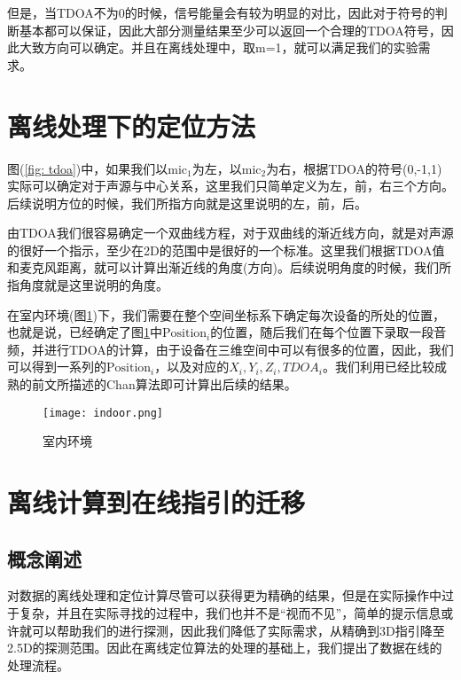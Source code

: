 \documentclass[winfonts]{njuthesis}
\begin{document}
		但是，当TDOA不为0的时候，信号能量会有较为明显的对比，因此对于符号的判断基本都可以保证，因此大部分测量结果至少可以返回一个合理的TDOA符号，因此大致方向可以确定。并且在离线处理中，取m=1，就可以满足我们的实验需求。
		
	\section{离线处理下的定位方法}
		
		图(\ref{fig: tdoa})中，如果我们以$\text{mic}_1$为左，以$\text{mic}_2$为右，根据TDOA的符号(0,-1,1)实际可以确定对于声源与中心关系，这里我们只简单定义为左，前，右三个方向。后续说明方位的时候，我们所指方向就是这里说明的左，前，后。
	
		由TDOA我们很容易确定一个双曲线方程，对于双曲线的渐近线方向，就是对声源的很好一个指示，至少在2D的范围中是很好的一个标准。这里我们根据TDOA值和麦克风距离，就可以计算出渐近线的角度(方向)。后续说明角度的时候，我们所指角度就是这里说明的角度。
		
		在室内环境(图\ref{fig: indoor})下，我们需要在整个空间坐标系下确定每次设备的所处的位置，也就是说，已经确定了图\ref{fig: indoor}中$\text{Position}_i$的位置，随后我们在每个位置下录取一段音频，并进行TDOA的计算，由于设备在三维空间中可以有很多的位置，因此，我们可以得到一系列的$\text{Position}_i$，以及对应的$X_i,Y_i,Z_i,TDOA_i$。我们利用已经比较成熟的前文所描述的Chan算法即可计算出后续的结果。
		
		\begin{figure}[H]
			\centering
			\texttt{[image: indoor.png]} 
			\caption{{室内环境}}
			\label{fig: indoor}
		\end{figure}
		
	
	\section{离线计算到在线指引的迁移}
	
		\subsection{概念阐述}
			
			对数据的离线处理和定位计算尽管可以获得更为精确的结果，但是在实际操作中过于复杂，并且在实际寻找的过程中，我们也并不是“视而不见”，简单的提示信息或许就可以帮助我们的进行探测，因此我们降低了实际需求，从精确到3D指引降至2.5D的探测范围。因此在离线定位算法的处理的基础上，我们提出了数据在线的处理流程。
		
\end{document}
